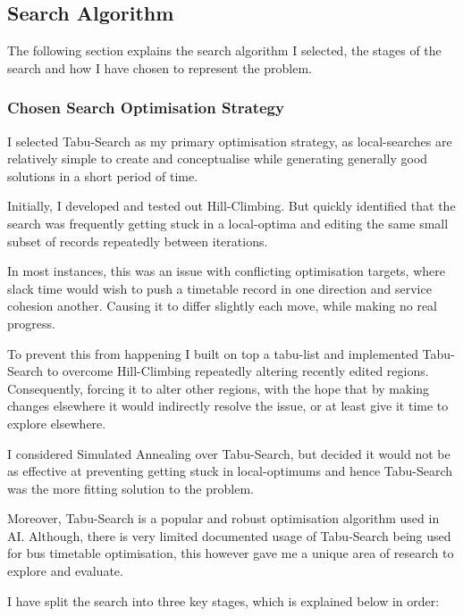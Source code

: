 \documentclass{article}
\begin{document}
\subsection{Search Algorithm}

The following section explains the search algorithm I selected, the stages of the search and how I have chosen to represent the problem.

\subsubsection{Chosen Search Optimisation Strategy}
I selected Tabu-Search as my primary optimisation strategy, as local-searches are relatively simple to create and conceptualise while generating generally good solutions in a short period of time. 

\par
Initially, I developed and tested out Hill-Climbing. But quickly identified that the search was frequently getting stuck in a local-optima and editing the same small subset of records repeatedly between iterations. 

\par 
In most instances, this was an issue with conflicting optimisation targets, where slack time would wish to push a timetable record in one direction and service cohesion another. Causing it to differ slightly each move, while making no real progress.

\par 
To prevent this from happening I built on top a tabu-list and implemented Tabu-Search to overcome Hill-Climbing repeatedly altering recently edited regions. Consequently, forcing it to alter other regions, with the hope that by making changes elsewhere it would indirectly resolve the issue, or at least give it time to explore elsewhere.


\par 
I considered Simulated Annealing over Tabu-Search, but decided it would not be as effective at preventing getting stuck in local-optimums and hence Tabu-Search was the more fitting solution to the problem.

\par 
Moreover, Tabu-Search is a popular and robust optimisation algorithm used in AI.  Although, there is very limited documented usage of Tabu-Search being used for bus timetable optimisation, this however gave me a unique area of research to explore and evaluate.


\par 
I have split the search into three key stages, which is explained below in order:
\end{document}
